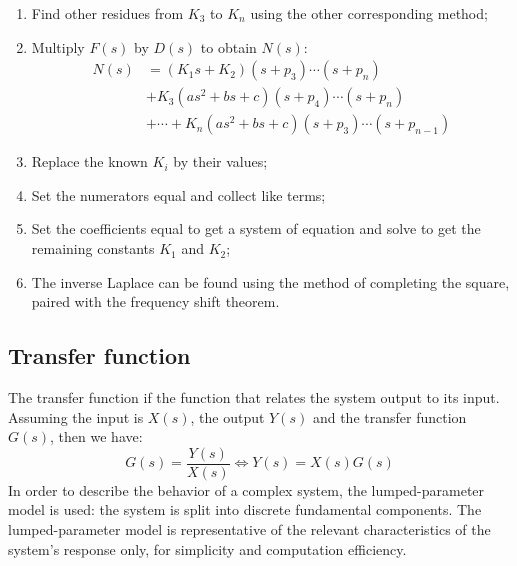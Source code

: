 \documentclass[10pt, twocolumn]{article}
\begin{document}
\begin{enumerate}
  \item Find other residues from \(K_3\) to \(K_n\) using the other corresponding method;
  \item Multiply \(F(s)\) by \(D(s)\) to obtain \(N(s)\):
        \begin{align*}
          N(s) & = (K_1s + K_2)(s + p_3) \cdots (s + p_n)                        \\
               & + K_3(as^2 + bs + c) (s + p_4) \cdots (s + p_n)                 \\
               & + \cdots + K_n (as^2 + bs + c) (s + p_3) \cdots (s + p_{n - 1})
        \end{align*}
  \item Replace the known \(K_i\) by their values;
  \item Set the numerators equal and collect like terms;
  \item Set the coefficients equal to get a system of equation and solve to get the remaining constants \(K_1\) and \(K_2\);
  \item The inverse Laplace can be found using the method of completing the square, paired with the frequency shift theorem.
\end{enumerate}



\subsection{Transfer function}
The transfer function if the function that relates the system output to its input.
Assuming the input is \(X(s)\), the output \(Y(s)\) and the transfer function \(G(s)\), then we have:
\[
  G(s) = \frac{Y(s)}{X(s)} \iff Y(s) = X(s) G(s)
\]
In order to describe the behavior of a complex system, the lumped-parameter model is used: the system is split into discrete fundamental components.
The lumped-parameter model is representative of the relevant characteristics of the system's response only, for simplicity and computation efficiency.
\end{document}
